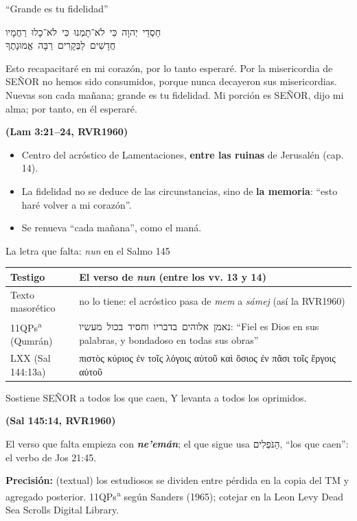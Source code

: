 \documentclass[hyperref={bookmarks=false},aspectratio=169]{beamer}
\newcommand{\heb}[1]{\mbox{\foreignlanguage{hebrew}{#1}}}
\newcommand{\grc}[1]{\foreignlanguage{ancientgreek}{#1}}
\newcommand{\SENOR}{S{\fontsize{0.78em}{1em}\selectfont EÑOR}}
\newcommand{\fuente}[1]{\par\hfill{\upshape\bfseries\footnotesize\textcolor{azul}{#1}}}
\newcommand{\destacar}[1]{\textbf{\textcolor{azul}{#1}}}
\newcommand{\precision}[1]{{\footnotesize\color{gris}\textbf{Precisión:} #1}}
\begin{document}
\begin{frame}{``Grande es tu fidelidad''}
\begin{center}
\heb{חַסְדֵי יְהוָה כִּי לֹא־תָמְנוּ כִּי לֹא־כָלוּ רַחֲמָיו}\\[2pt]
\heb{חֲדָשִׁים לַבְּקָרִים רַבָּה אֱמוּנָתֶךָ}
\end{center}
\begin{cita}Esto recapacitaré en mi corazón, por lo tanto esperaré. Por la misericordia de \SENOR{} no hemos sido consumidos, porque nunca decayeron sus misericordias. Nuevas son cada mañana; grande es tu fidelidad. Mi porción es \SENOR, dijo mi alma; por tanto, en él esperaré.\fuente{(Lam 3:21--24, RVR1960)}\end{cita}
\small
\begin{itemize}
\item Centro del acróstico de Lamentaciones, \destacar{entre las ruinas} de Jerusalén (cap. 14).
\item La fidelidad no se deduce de las circunstancias, sino de \destacar{la memoria}: ``esto haré volver a mi corazón''.
\item Se renueva ``cada mañana'', como el maná.
\end{itemize}
\end{frame}

\begin{frame}{La letra que falta: \emph{nun} en el Salmo 145}
\scriptsize\renewcommand{\arraystretch}{1.2}
\begin{tabular}{@{}>{\RaggedRight\arraybackslash}p{2.6cm}>{\RaggedRight\arraybackslash}p{9.3cm}@{}}
\toprule
\textbf{Testigo} & \textbf{El verso de \emph{nun} (entre los vv. 13 y 14)} \\ \midrule
Texto masorético & no lo tiene: el acróstico pasa de \emph{mem} a \emph{sámej} (así la RVR1960) \\
11QPs\textsuperscript{a} (Qumrán) & \heb{נאמן אלוהים בדבריו וחסיד בכול מעשיו}: ``Fiel es Dios en sus palabras, y bondadoso en todas sus obras'' \\
LXX (Sal 144:13a) & \grc{πιστὸς κύριος ἐν τοῖς λόγοις αὐτοῦ καὶ ὅσιος ἐν πᾶσι τοῖς ἔργοις αὐτοῦ} \\
\bottomrule
\end{tabular}\par\medskip
\begin{cita}Sostiene \SENOR{} a todos los que caen, Y levanta a todos los oprimidos.\fuente{(Sal 145:14, RVR1960)}\end{cita}
\small El verso que falta empieza con \destacar{\emph{ne'emán}}; el que sigue usa \heb{הַנֹּפְלִים}, ``los que caen'': el verbo de Jos 21:45.\par\smallskip
\precision{(textual) los estudiosos se dividen entre pérdida en la copia del TM y agregado posterior. 11QPs\textsuperscript{a} según Sanders (1965); cotejar en la Leon Levy Dead Sea Scrolls Digital Library.}
\end{frame}
\end{document}

